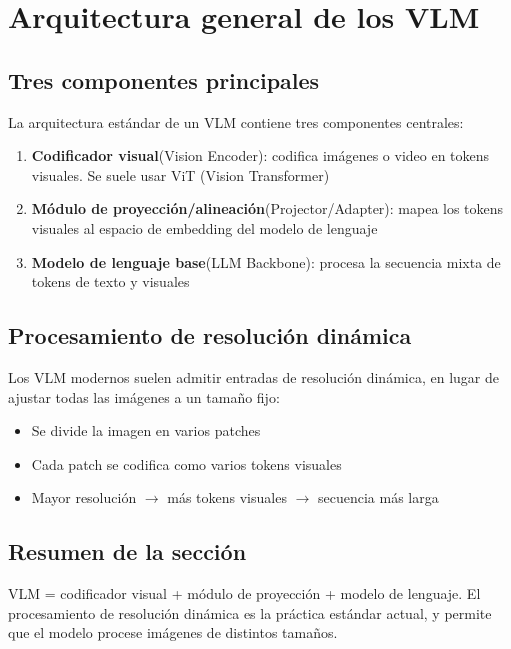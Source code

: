 \section{Arquitectura general de los VLM}

\subsection{Tres componentes principales}

La arquitectura estándar de un VLM contiene tres componentes centrales:

\begin{enumerate}
  \item \textbf{Codificador visual}(Vision Encoder): codifica imágenes o video en tokens visuales. Se suele usar ViT (Vision Transformer)
  \item \textbf{Módulo de proyección/alineación}(Projector/Adapter): mapea los tokens visuales al espacio de embedding del modelo de lenguaje
  \item \textbf{Modelo de lenguaje base}(LLM Backbone): procesa la secuencia mixta de tokens de texto y visuales
\end{enumerate}

\subsection{Procesamiento de resolución dinámica}

Los VLM modernos suelen admitir entradas de resolución dinámica, en lugar de ajustar todas las imágenes a un tamaño fijo:
\begin{itemize}
  \item Se divide la imagen en varios patches
  \item Cada patch se codifica como varios tokens visuales
  \item Mayor resolución $\to$ más tokens visuales $\to$ secuencia más larga
\end{itemize}

\subsection{Resumen de la sección}

VLM = codificador visual + módulo de proyección + modelo de lenguaje. El procesamiento de resolución dinámica es la práctica estándar actual, y permite que el modelo procese imágenes de distintos tamaños.

